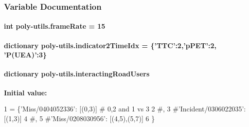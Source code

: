 \subsubsection{Variable Documentation}
\hypertarget{namespacepoly-utils_afd6fd6883ca01f5c35efbd65a12e4ac1}{
\paragraph[{frame\-Rate}]{\setlength{\rightskip}{0pt plus 5cm}int poly-\/utils.\-frame\-Rate = 15}}\label{namespacepoly-utils_afd6fd6883ca01f5c35efbd65a12e4ac1}
\hypertarget{namespacepoly-utils_a0e845d97dbbcae36f39bd832c890ad7a}{
\paragraph[{indicator2\-Time\-Idx}]{\setlength{\rightskip}{0pt plus 5cm}dictionary poly-\/utils.\-indicator2\-Time\-Idx = \{'T\-T\-C'\-:2,'p\-P\-E\-T'\-:2, 'P(U\-E\-A)'\-:3\}}}\label{namespacepoly-utils_a0e845d97dbbcae36f39bd832c890ad7a}
\hypertarget{namespacepoly-utils_adf6aa542a17dc9d5d13a19e44c9425c0}{
\paragraph[{interacting\-Road\-Users}]{\setlength{\rightskip}{0pt plus 5cm}dictionary poly-\/utils.\-interacting\-Road\-Users}}\label{namespacepoly-utils_adf6aa542a17dc9d5d13a19e44c9425c0}
{\bfseries Initial value\-:}
\begin{DoxyCode}
1 = \{\textcolor{stringliteral}{'Miss/0404052336'}: [(0,3)] \textcolor{comment}{# 0,2 and 1 vs 3}
2                         \textcolor{comment}{#,}
3                         \textcolor{comment}{#'Incident/0306022035': [(1,3)]}
4                         \textcolor{comment}{#,}
5                         \textcolor{comment}{#'Miss/0208030956': [(4,5),(5,7)]}
6                         \}
\end{DoxyCode}
